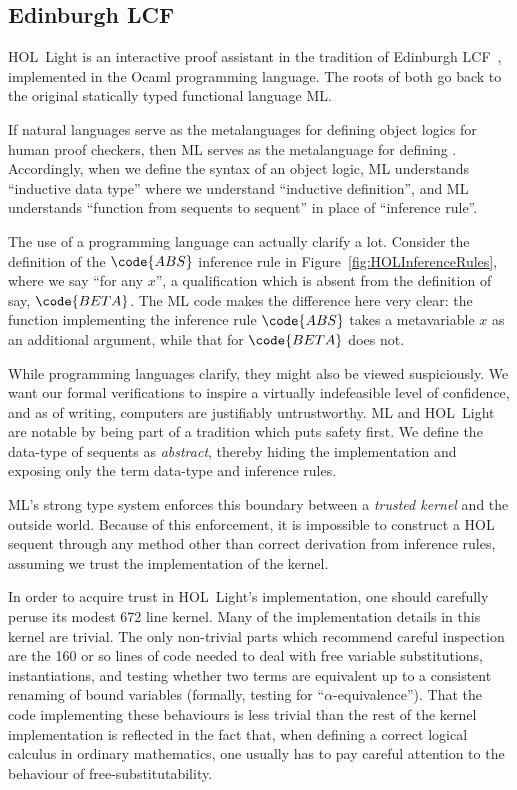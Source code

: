 \subsection{Edinburgh LCF}
HOL~Light is an interactive proof assistant in the tradition of Edinburgh LCF~\cite{LCF}, implemented in the Ocaml programming language. The roots of both go back to the original statically typed functional language ML.

If natural languages serve as the metalanguages for defining object logics for human proof checkers, then ML serves as the metalanguage for defining . Accordingly, when we define the syntax of an object logic, ML understands ``inductive data type'' where we understand ``inductive definition'', and ML understands ``function from sequents to sequent'' in place of ``inference rule''.

The use of a programming language can actually clarify a lot. Consider the definition of the $\code{ABS}$ inference rule in Figure~\ref{fig:HOLInferenceRules}, where we say ``for any $x$'', a qualification which is absent from the definition of say, $\code{BETA}$. The ML code makes the difference here very clear: the function implementing the inference rule $\code{ABS}$ takes a metavariable $x$ as an additional argument, while that for $\code{BETA}$ does not.

While programming languages clarify, they might also be viewed suspiciously. We want our formal verifications to inspire a virtually indefeasible level of confidence, and as of writing, computers are justifiably untrustworthy. ML and HOL~Light are notable by being part of a tradition which puts safety first. We define the data-type of sequents as \emph{abstract}, thereby hiding the implementation and exposing only the term data-type and inference rules.

ML's strong type system enforces this boundary between a \emph{trusted kernel} and the outside world. Because of this enforcement, it is impossible to construct a HOL sequent through any method other than correct derivation from inference rules, assuming we trust the implementation of the kernel.

In order to acquire trust in HOL~Light's implementation, one should carefully peruse its modest 672 line kernel. Many of the implementation details in this kernel are trivial. The only non-trivial parts which recommend careful inspection are the 160 or so lines of code needed to deal with free variable substitutions, instantiations, and testing whether two terms are equivalent up to a consistent renaming of bound variables (formally, testing for ``$\alpha$-equivalence''). That the code implementing these behaviours is less trivial than the rest of the kernel implementation is reflected in the fact that, when defining a correct logical calculus in ordinary mathematics, one usually has to pay careful attention to the behaviour of free-substitutability. 

